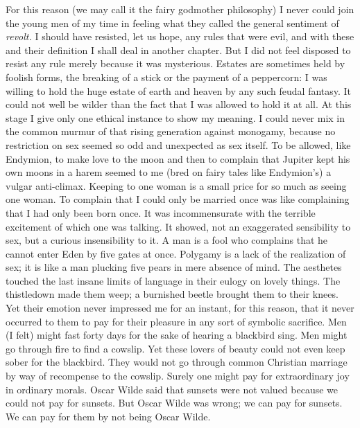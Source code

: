 \documentclass{book}
\begin{document}
For this reason (we may call it the fairy godmother philosophy) I never could join the young men of my time in feeling what they called the general sentiment of \emph{revolt.} I should have resisted, let us hope, any rules that were evil, and with these and their definition I shall deal in another chapter. But I did not feel disposed to resist any rule merely because it was mysterious. Estates are sometimes held by foolish forms, the breaking of a stick or the payment of a peppercorn: I was willing to hold the huge estate of earth and heaven by any such feudal fantasy. It could not well be wilder than the fact that I was allowed to hold it at all. At this stage I give only one ethical instance to show my meaning. I could never mix in the common murmur of that rising generation against monogamy, because no restriction on sex seemed so odd and unexpected as sex itself. To be allowed, like Endymion, to make love to the moon and then to complain that Jupiter kept his own moons in a harem seemed to me (bred on fairy tales like Endymion’s) a vulgar anti-climax. Keeping to one woman is a small price for so much as seeing one woman. To complain that I could only be married once was like complaining that I had only been born once. It was incommensurate with the terrible excitement of which one was talking. It showed, not an exaggerated sensibility to sex, but a curious insensibility to it. A man is a fool who complains that he cannot enter Eden by five gates at once. Polygamy is a lack of the realization of sex; it is like a man plucking five pears in mere absence of mind. The aesthetes touched the last insane limits of language in their eulogy on lovely things. The thistledown made them weep; a burnished beetle brought them to their knees. Yet their emotion never impressed me for an instant, for this reason, that it never occurred to them to pay for their pleasure in any sort of symbolic sacrifice. Men (I felt) might fast forty days for the sake of hearing a blackbird sing. Men might go through fire to find a cowslip. Yet these lovers of beauty could not even keep sober for the blackbird. They would not go through common Christian marriage by way of recompense to the cowslip. Surely one might pay for extraordinary joy in ordinary morals. Oscar Wilde said that sunsets were not valued because we could not pay for sunsets. But Oscar Wilde was wrong; we can pay for sunsets. We can pay for them by not being Oscar Wilde.
\end{document}
